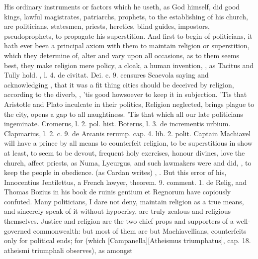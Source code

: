 {His ordinary instruments or factors which he useth, as God himself, did
good kings, lawful magistrates, patriarchs, prophets, to the
establishing of his church, are politicians, statesmen, priests,
heretics, blind guides, impostors, pseudoprophets, to propagate his
superstition. And first to begin of politicians, it hath ever been a
principal axiom with them to maintain religion or superstition, which
they determine of, alter and vary upon all occasions, as to them seems
best, they make religion mere policy, a cloak, a human invention, , as Tacitus
and Tully hold. \Austin{}, l. 4. de civitat. Dei. c. 9. censures
Scaevola saying and acknowledging ,
that it was a fit thing cities should be deceived by religion,
according to the diverb, , 'tis good howsoever to keep it
in subjection. 'Tis that Aristotle and Plato inculcate in
their politics, Religion neglected, brings plague to the city, opens a
gap to all naughtiness. 'Tis that which all our late politicians
ingeminate. Cromerus, l. 2. pol. hist. Boterus, l. 3. de incrementis
urbium. Clapmarius, l. 2. c. 9. de Arcanis rerump. cap. 4. lib. 2.
polit. Captain Machiavel will have a prince by all means to counterfeit
religion, to be superstitious in show at least, to seem to be devout,
frequent holy exercises, honour divines, love the church, affect
priests, as Numa, Lycurgus, and such lawmakers were and did, , to keep the people in obedience.  (as
Cardan writes) , \etc{}. But this error of his, Innocentius Jentilettus, a
French lawyer, theorem. 9. comment. 1. de Relig, and Thomas Bozius in
his book \textlatin{de ruinis gentium et Regnorum} have copiously confuted. Many
politicians, I dare not deny, maintain religion as a true means, and
sincerely speak of it without hypocrisy, are truly zealous and
religious themselves. Justice and religion are the two chief props and
supporters of a well-governed commonwealth: but most of them are but
Machiavellians, counterfeits only for political ends; for 
(which [Campanella][\textlatin{Atheismus triumphatus}], cap. 18. \textlatin{atheismi triumphali} observes), as amongst
}
